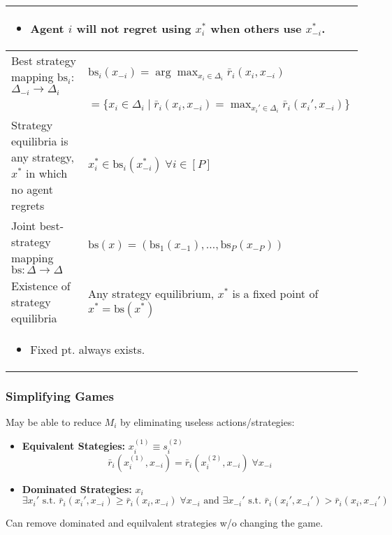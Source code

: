 \begin{summary}
\begin{center}
\begin{tabular}{ll}
            \multicolumn{2}{p{\linewidth}}{
                \begin{itemize}
                    \item Agent $i$ will not regret using $x_i^*$ when others use $x_{-i}^*$.
                \end{itemize}} \\
            \midrule
            Best strategy mapping $\text{bs}_i$: $\Delta_{-i} \to \Delta_i$ & $\text{bs}_i (x_{-i}) = \arg \max_{x_i \in \Delta_i} \bar{r}_i (x_i,x_{-i})$ \\
            & $ = \{x_i \in \Delta_i \mid \bar{r}_i (x_i,x_{-i}) = \max_{x_i' \in \Delta_i} \bar{r}_i (x_i',x_{-i})\}$ \\
            \midrule
            Strategy equilibria is any strategy, $x^*$ in which no agent regrets & $x_i^* \in \text{bs}_i (x_{-i}^*) \; \forall i \in [P]$ \\
            \midrule
            Joint best-strategy mapping $\text{bs}: \Delta \to \Delta$ & $\text{bs}(x) = (\text{bs}_1(x_{-1}),\ldots,\text{bs}_P(x_{-P}))$ \\
            \midrule
            Existence of strategy equilibria & Any strategy equilibrium, $x^*$ is a fixed point of $x^* = \text{bs}(x^*)$ \\
            \multicolumn{2}{p{\linewidth}}{
                \begin{itemize}
                    \item Fixed pt. always exists. 
                \end{itemize}} \\
            \bottomrule            
        \end{tabular}
    \end{center}
\end{summary}

\subsubsection{Simplifying Games}
\begin{notes} May be able to reduce $M_i$ by eliminating useless actions/strategies: 
    \begin{itemize}
        \item \textbf{Equivalent Stategies:} $x_i^{(1)} \equiv s_i^{(2)}$
        \begin{equation*}
            \bar{r}_i(x_i^{(1)},x_{-i}) = \bar{r}_i(x_i^{(2)},x_{-i}) \; \forall x_{-i} 
        \end{equation*}
        \item \textbf{Dominated Strategies:} $x_i$ 
        \begin{equation*}
            \exists x_i' \text{ s.t. } \bar{r}_i(x_i',x_{-i}) \geq \bar{r}_i(x_i,x_{-i}) \; \forall x_{-i} \text{ and } \exists x_{-i}' \text{ s.t. } \bar{r}_i(x_i',x_{-i}') > \bar{r}_i(x_i,x_{-i}')
        \end{equation*}
    \end{itemize}
    Can remove dominated and equilvalent strategies w/o changing the game. 
\end{notes}
\newpage

